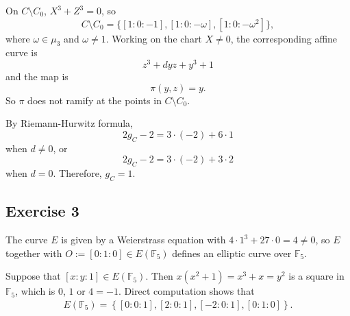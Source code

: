 \documentclass{article}
\theoremstyle{definition}
\theoremstyle{remark}
\newcommand{\F}{\mathbb{F}}
\begin{document}
\begin{enumerate}
    On $C\setminus C_0$, $X^3 + Z^3 = 0$, so \[C\setminus C_0 = \{[1 : 0 : -1], [1 : 0 : -\omega], [1 : 0 : -\omega^2]\},\]
    where $\omega\in\mu_3$ and $\omega\ne 1$.
    Working on the chart $X\ne 0$, the corresponding affine curve is \[z^3 + dyz + y^3 + 1\] and the map is \[\pi(y, z) = y.\]
    So $\pi$ does not ramify at the points in $C\setminus C_0$.

    By Riemann-Hurwitz formula,
    \[2g_C-2 = 3\cdot (-2)  + 6\cdot 1\] when $d\ne 0$, or {\color{red}\[2g_C-2 = 3\cdot (-2)  + 3\cdot 2\] when $d = 0$.}
    Therefore, $g_C = 1$.



\end{enumerate}

\subsection*{Exercise 3}
The curve $E$ is given by a Weierstrass equation with $4\cdot 1^3 + 27\cdot 0 = 4\ne 0$, so $E$ together with $O := [0 : 1 : 0]\in E(\F_5)$ defines an elliptic curve over $\F_5$.

Suppose that $[x : y : 1]\in E(\F_5)$. Then $x(x^2+1) = x^3 + x = y^2$ is a square in $\F_5$, which is $0$, $1$ or $4 = -1$.
Direct computation shows that
\begin{align*}
    E(\F_5) = \left\{[0 : 0 : 1], [2 : 0 : 1], [-2 : 0 : 1], [0 : 1 : 0]\right\}.
\end{align*}
\end{document}
